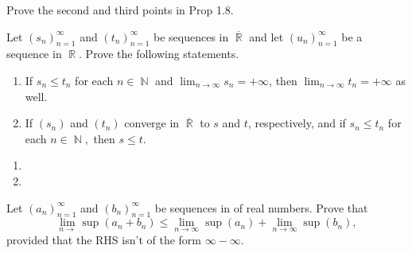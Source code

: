 \documentclass[12pt,letterpaper,boxed]{hmcpset}
\DeclareMathOperator{\N}{\mathbb{N}}
\DeclareMathOperator{\R}{\mathbb{R}}
\begin{document}
\begin{problem}[Exercise 1.9]
Prove the second and third points in Prop 1.8.
\end{problem}

\begin{solution}

\end{solution}

\begin{problem}[Exercise 4.2]
Let $(s_n)_{n=1}^{\infty}$ and $(t_n)_{n=1}^{\infty}$ be sequences in $\overline{\R}$ and let $(u_n)_{n=1}^{\infty}$ be a sequence in $\R$. Prove the following statements.
\vspace{-2mm}
    \begin{enumerate}
        \itemsep0em
        \item If $s_n \leq t_n$ for each $n\in\N$ and $\lim_{n\rightarrow \infty} s_n = + \infty$, then $\lim_{n\rightarrow \infty} t_n = + \infty$ as well.
        \item If $(s_n)$ and $(t_n)$ converge in $\overline{\R}$ to $s$ and $t$, respectively, and if $s_n \leq t_n$ for each $n\in\N,$ then $s \leq t.$
    \end{enumerate}
\end{problem}

\begin{solution}
\begin{enumerate}
        \itemsep0em
        \item 
        \item
    \end{enumerate}
\end{solution}

\begin{problem}[Exercise 4.2]
Let $(a_n)_{n=1}^{\infty}$ and $(b_n)_{n=1}^{\infty}$ be sequences in of real numbers. Prove that $$\lim_{n \rightarrow} \sup(a_n + b_n) \leq \lim_{n \rightarrow \infty} \sup(a_n) + \lim_{n \rightarrow \infty} \sup(b_n),$$ provided that the RHS isn't of the form $\infty - \infty$.
\end{problem}

\begin{solution}

\end{solution}
\end{document}
